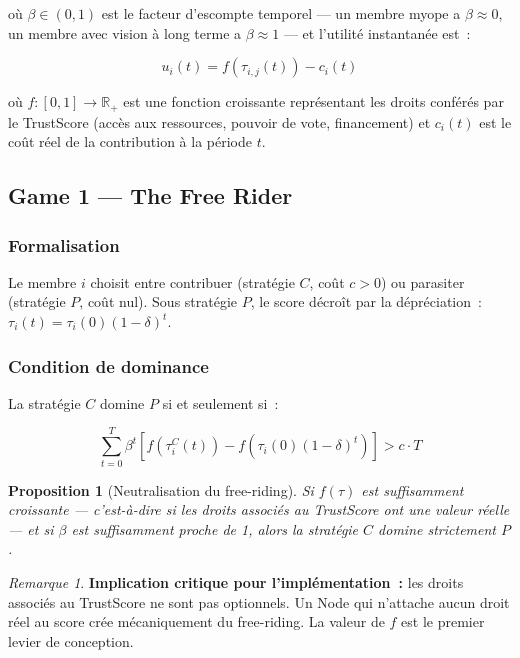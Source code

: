 \documentclass[12pt,a4paper]{article}
\theoremstyle{definition}
\theoremstyle{plain}
\newtheorem{proposition}{Proposition}[section]
\theoremstyle{remark}
\newtheorem{remarque}{Remarque}[section]
\newcommand{\trustscore}{\tau}
\newcommand{\R}{\mathbb{R}}
\newcommand{\1}{\mathbf{1}}
\begin{document}
où $\beta \in (0,1)$ est le facteur d'escompte temporel --- un membre
\og{}myope\fg{} a $\beta \approx 0$, un membre avec vision à long terme a
$\beta \approx 1$ --- et l'utilité instantanée est~:

\begin{equation}
u_i(t) = f(\trustscore_{i,j}(t)) - c_i(t)
\end{equation}

où $f : [0,1] \to \R_+$ est une fonction croissante représentant les droits
conférés par le TrustScore (accès aux ressources, pouvoir de vote, financement)
et $c_i(t)$ est le coût réel de la contribution à la période $t$.

\subsection{Game 1 --- The Free Rider}

\subsubsection{Formalisation}

Le membre $i$ choisit entre contribuer (stratégie $C$, coût $c > 0$) ou
parasiter (stratégie $P$, coût nul). Sous stratégie $P$, le score décroît
par la dépréciation~: $\trustscore_i(t) = \trustscore_i(0)(1-\delta)^t$.

\subsubsection{Condition de dominance}

La stratégie $C$ domine $P$ si et seulement si~:

\begin{equation}
\sum_{t=0}^{T} \beta^t \left[f(\trustscore_i^C(t)) - f\!\left(\trustscore_i(0)(1-\delta)^t\right)\right] > c \cdot T
\label{eq:freerider}
\end{equation}

\begin{proposition}[Neutralisation du free-riding]
Si $f(\trustscore)$ est suffisamment croissante --- c'est-à-dire si les droits
associés au TrustScore ont une valeur réelle --- et si $\beta$ est
suffisamment proche de 1, alors la stratégie $C$ domine strictement $P$.
\end{proposition}

\begin{remarque}
\textbf{Implication critique pour l'implémentation~:} les droits associés au
TrustScore ne sont pas optionnels. Un Node qui n'attache aucun droit réel au
score crée mécaniquement du free-riding. La valeur de $f$ est le premier levier
de conception.
\end{remarque}
\end{document}
